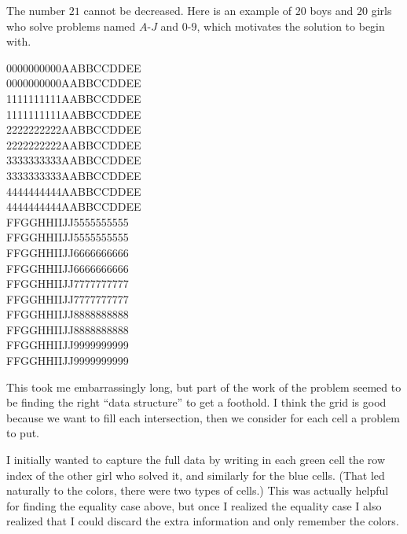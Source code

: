 \begin{remark*}
The number $21$ cannot be decreased.
Here is an example of $20$ boys and $20$ girls
who solve problems named $A$-$J$
and $0$-$9$, which motivates the solution to begin with.
\begin{center}
\scriptsize \ttfamily
{\color{green}0000000000}{\color{blue}AABBCCDDEE} \\
{\color{green}0000000000}{\color{blue}AABBCCDDEE} \\
{\color{green}1111111111}{\color{blue}AABBCCDDEE} \\
{\color{green}1111111111}{\color{blue}AABBCCDDEE} \\
{\color{green}2222222222}{\color{blue}AABBCCDDEE} \\
{\color{green}2222222222}{\color{blue}AABBCCDDEE} \\
{\color{green}3333333333}{\color{blue}AABBCCDDEE} \\
{\color{green}3333333333}{\color{blue}AABBCCDDEE} \\
{\color{green}4444444444}{\color{blue}AABBCCDDEE} \\
{\color{green}4444444444}{\color{blue}AABBCCDDEE} \\
{\color{blue}FFGGHHIIJJ}{\color{green}5555555555} \\
{\color{blue}FFGGHHIIJJ}{\color{green}5555555555} \\
{\color{blue}FFGGHHIIJJ}{\color{green}6666666666} \\
{\color{blue}FFGGHHIIJJ}{\color{green}6666666666} \\
{\color{blue}FFGGHHIIJJ}{\color{green}7777777777} \\
{\color{blue}FFGGHHIIJJ}{\color{green}7777777777} \\
{\color{blue}FFGGHHIIJJ}{\color{green}8888888888} \\
{\color{blue}FFGGHHIIJJ}{\color{green}8888888888} \\
{\color{blue}FFGGHHIIJJ}{\color{green}9999999999} \\
{\color{blue}FFGGHHIIJJ}{\color{green}9999999999}
\end{center}
\end{remark*}

\begin{remark*}
  This took me embarrassingly long,
  but part of the work of the problem seemed to be
  finding the right ``data structure'' to get a foothold.
  I think the grid is good because we want to fill each intersection,
  then we consider for each cell a problem to put.

  I initially wanted to capture the full data by writing
  in each green cell the row index of the other girl who solved it,
  and similarly for the blue cells.
  (That led naturally to the colors, there were two types of cells.)
  This was actually helpful for finding the equality case above,
  but once I realized the equality case
  I also realized that I could discard the extra information
  and only remember the colors.
\end{remark*}
